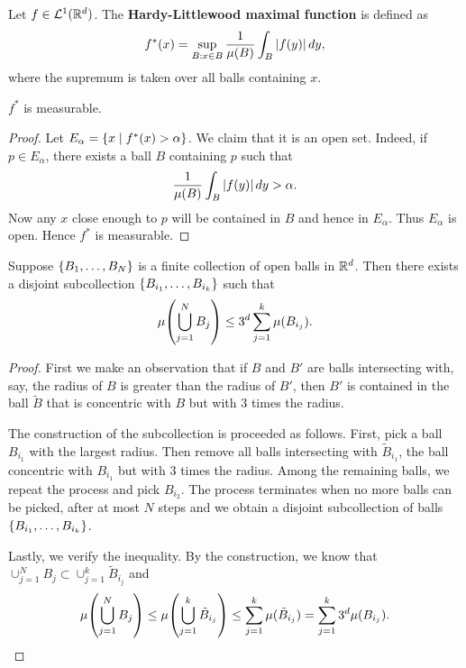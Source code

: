 \begin{definition}
    Let $f\in\mathcal{L}^1(\mathbb{R}^d)$. The \textbf{Hardy-Littlewood maximal function} 
    is defined as 
    \begin{equation*}
        f^*(x) = \sup_{B:x\in B} \frac{1}{\mu(B)}\int_B \left\lvert {f(y)} \right\rvert dy,
    \end{equation*}
    where the supremum is taken over all balls containing $x$.
\end{definition}
\begin{proposition}
    $f^*$ is measurable. 
\end{proposition}
\begin{proof}
    Let $E_\alpha = \left\{ x \;\middle\vert\; f^*(x)>\alpha \right\}$. We claim that it is 
    an open set. Indeed, if $p\in E_\alpha$, there exists a ball 
    $B$ containing $p$ such that 
    \begin{equation*}
        \frac{1}{\mu(B)}\int_B \left\lvert {f(y)} \right\rvert dy > \alpha.
    \end{equation*}
    Now any $x$ close enough to $p$ will be contained in $B$ and 
    hence in $E_\alpha$. Thus $E_\alpha$ is open. Hence $f^*$ is
    measurable.
\end{proof}

\begin{lemma}\label{prop:vitali_cover}
    Suppose $\left\{ {B_1,\ldots,B_N} \right\}$ is a finite collection of open 
    balls in $\mathbb{R}^d$. Then there exists a disjoint subcollection 
    $\left\{ {B_{i_1},\ldots,B_{i_k}} \right\}$ such that
    \begin{equation*}
        \mu\pth{\bigcup_{j=1}^N B_j} \leq 3^d\sum_{j=1}^k \mu(B_{i_j}).
    \end{equation*}
\end{lemma}
\begin{proof}
    First we make an observation that if $B$ and $B'$ are balls 
    intersecting with, say, the radius of $B$ is greater than 
    the radius of $B'$, then $B'$ is contained in the ball $\tilde{B}$ 
    that is concentric with $B$ but with $3$ times the radius. 

    The construction of the subcollection is proceeded as follows. 
    First, pick a ball $B_{i_1}$ with the largest radius. Then 
    remove all balls intersecting with $\tilde{B}_{i_1}$, the ball 
    concentric with $B_{i_1}$ but with $3$ times the radius. 
    Among the remaining balls, we repeat the process and pick $B_{i_2}$. 
    The process terminates when no more balls can be picked, 
    after at most $N$ steps and we obtain a disjoint subcollection 
    of balls $\left\{ {B_{i_1},\ldots,B_{i_k}} \right\}$. 

    Lastly, we verify the inequality. By the construction, 
    we know that $\cup_{j=1}^N B_j\subset \cup_{j=1}^k\tilde{B}_{i_j}$
    and 
    \begin{equation*}
        \mu\pth{\bigcup_{j=1}^N B_j} \leq \mu\pth{\bigcup_{j=1}^k\tilde{B}_{i_j}} 
        \leq \sum_{j=1}^{k} \mu(\tilde{B}_{i_j})
        = \sum_{j=1}^{k} 3^d\mu(B_{i_j}).
    \end{equation*}
\end{proof}

